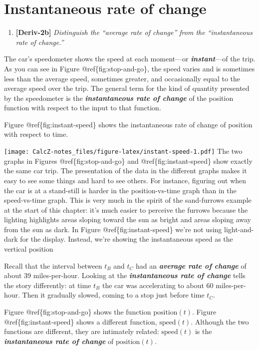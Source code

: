 \documentclass[
]{book}
\providecommand{\tightlist}{%
  \setlength{\itemsep}{0pt}\setlength{\parskip}{0pt}}
\begin{document}
\hypertarget{instantaneous-rate-of-change}{%
\section{Instantaneous rate of change}\label{instantaneous-rate-of-change}}

\begin{enumerate}
\tightlist
\item
  \textbf{{[}Deriv-2b{]}} \emph{Distinguish the ``average rate of change'' from the ``instantaneous rate of change.''}
\end{enumerate}

The car's speedometer shows the speed at each moment---or \textbf{\emph{instant}}---of the trip. As you can see in Figure @ref\{fig:stop-and-go\}, the speed varies and is sometimes less than the average speed, sometimes greater, and occasionally equal to the average speed over the trip. The general term for the kind of quantity presented by the speedometer is the \textbf{\emph{instantaneous rate of change}} of the position function with respect to the input to that function.

Figure @ref\{fig:instant-speed\} shows the instantaneous rate of change of position with respect to time.

\texttt{[image: CalcZ-notes\_files/figure-latex/instant-speed-1.pdf]}
The two graphs in Figures @ref\{fig:stop-and-go\} and @ref\{fig:instant-speed\} show exactly the same car trip. The presentation of the data in the different graphs makes it easy to see some things and hard to see others. For instance, figuring out when the car is at a stand-still is harder in the position-vs-time graph than in the speed-vs-time graph. This is very much in the spirit of the sand-furrows example at the start of this chapter: it's much easier to perceive the furrows because the lighting highlights areas sloping toward the sun as bright and areas sloping away from the sun as dark. In Figure @ref\{fig:instant-speed\} we're not using light-and-dark for the display. Instead, we're showing the instantaneous speed as the vertical position

Recall that the interval between \(t_B\) and \(t_C\) had an \textbf{\emph{average rate of change}} of about 39 miles-per-hour. Looking at the \textbf{\emph{instantaneous rate of change}} tells the story differently: at time \(t_B\) the car was accelerating to about 60 miles-per-hour. Then it gradually slowed, coming to a stop just before time \(t_C\).

Figure @ref\{fig:stop-and-go\} shows the function \(\mbox{position}(t)\). Figure @ref\{fig:instant-speed\} shows a different function, \(\mbox{speed}(t)\). Although the two functions are different, they are intimately related: \(\mbox{speed}(t)\) is the \textbf{\emph{instantaneous rate of change}} of \(\mbox{position}(t)\).
\end{document}
